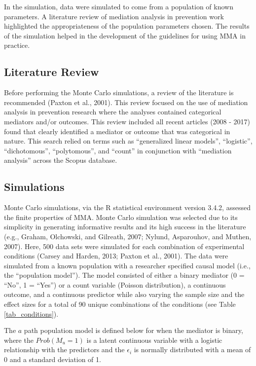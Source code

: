 \documentclass[]{DissertateUSU}
\begin{document}
In the simulation, data were simulated to come from a population of
known parameters. A literature review of mediation analysis in
prevention work highlighted the appropriateness of the population
parameters chosen. The results of the simulation helped in the
development of the guidelines for using MMA in practice.

\subsection{Literature Review}\label{literature-review}

Before performing the Monte Carlo simulations, a review of the
literature is recommended (Paxton et al., 2001). This review focused on
the use of mediation analysis in prevention research where the analyses
contained categorical mediators and/or outcomes. This review included
all recent articles (2008 - 2017) found that clearly identified a
mediator or outcome that was categorical in nature. This search relied
on terms such as ``generalized linear models'', ``logistic'',
``dichotomous'', ``polytomous'', and ``count'' in conjunction with
``mediation analysis'' across the Scopus database.

\subsection{Simulations}\label{simulations}

Monte Carlo simulations, via the R statistical environment version
3.4.2, assessed the finite properties of MMA. Monte Carlo simulation was
selected due to its simplicity in generating informative results and its
high success in the literature (e.g., Graham, Olchowski, and Gilreath,
2007; Nylund, Asparouhov, and Muthen, 2007). Here, 500 data sets were
simulated for each combination of experimental conditions (Carsey and
Harden, 2013; Paxton et al., 2001). The data were simulated from a known
population with a researcher specified causal model (i.e., the
``population model''). The model consisted of either a binary mediator
(0 = ``No'', 1 = ``Yes'') or a count variable (Poisson distribution), a
continuous outcome, and a continuous predictor while also varying the
sample size and the effect sizes for a total of 90 unique combinations
of the conditions (see Table \ref{tab_conditions}).

The \(a\) path population model is defined below for when the mediator
is binary, where the \(Prob(M_{u} = 1)\) is a latent continuous variable
with a logistic relationship with the predictors and the \(\epsilon_i\)
is normally distributed with a mean of 0 and a standard deviation of 1.
\end{document}
